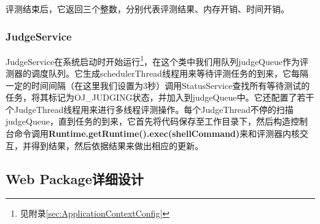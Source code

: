评测结束后，它返回三个整数，分别代表评测结果、内存开销、时间开销。

\subsubsection{JudgeService}
JudgeService在系统启动时开始运行\footnote{见附录\ref{sec:ApplicationContextConfig}}，在这个类中我们用队列judgeQueue作为评测器的调度队列。它生成schedulerThread线程用来等待评测任务的到来，它每隔一定的时间间隔（在这里我们设置为3秒）调用StatusService查找所有等待测试的任务，将其标记为OJ\_JUDGING状态，并加入到judgeQueue中。它还配置了若干个JudgeThread线程用来进行多线程评测操作。每个JudgeThread不停的扫描judgeQueue，直到任务的到来，它首先将代码保存至工作目录下，然后构造控制台命令调用\textbf{Runtime.getRuntime().exec(shellCommand)}来和评测器内核交互，并得到结果，然后依据结果来做出相应的更新。


\subsection{Web Package详细设计}